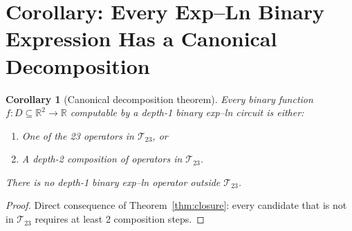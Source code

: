 \documentclass[11pt]{article}
\newtheorem{corollary}[theorem]{Corollary}
\begin{document}
\section{Corollary: Every Exp--Ln Binary Expression Has a Canonical Decomposition}

\begin{corollary}[Canonical decomposition theorem]
Every binary function $f: D \subseteq \mathbb{R}^2 \to \mathbb{R}$ computable
by a depth-1 binary exp--ln circuit is either:
\begin{enumerate}
  \item One of the 23 operators in $\mathcal{T}_{23}$, or
  \item A depth-2 composition of operators in $\mathcal{T}_{23}$.
\end{enumerate}
There is no depth-1 binary exp--ln operator outside $\mathcal{T}_{23}$.
\end{corollary}

\begin{proof}
Direct consequence of Theorem~\ref{thm:closure}: every candidate that is not in
$\mathcal{T}_{23}$ requires at least 2 composition steps.
\end{proof}
\end{document}
